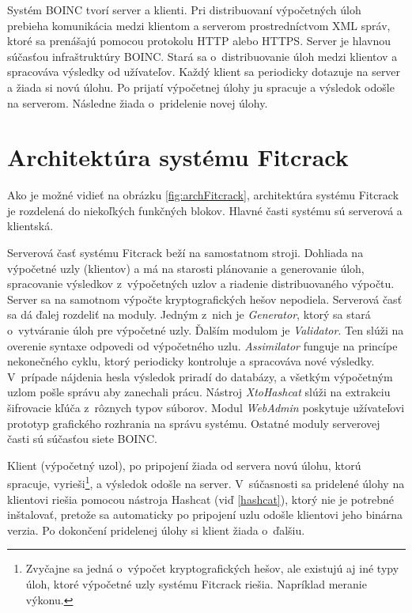 \documentclass[slovak,cprint]{fitthesis} %
\begin{document}
Systém BOINC tvorí server a klienti. Pri distribuovaní výpočetných úloh prebieha komunikácia medzi klientom a serverom prostredníctvom XML správ, ktoré sa prenášajú pomocou protokolu HTTP alebo HTTPS.
Server je hlavnou súčasťou infraštruktúry BOINC. Stará sa o~distribuovanie úloh medzi klientov a spracováva výsledky od užívateľov.
Každý klient sa periodicky dotazuje na server a žiada si novú úlohu. Po prijatí výpočetnej úlohy ju spracuje a výsledok odošle na serverom. Následne žiada o~pridelenie novej úlohy.\cite{boinccitace}


\section{Architektúra systému Fitcrack}
Ako je možné vidieť na obrázku \ref{fig:archFitcrack}, architektúra systému Fitcrack je rozdelená do niekoľkých funkčných blokov. Hlavné časti systému sú serverová a klientská.

Serverová časť systému Fitcrack beží na samostatnom stroji. Dohliada na výpočetné uzly (klientov) a má na starosti plánovanie a generovanie úloh, spracovanie výsledkov z~výpočetných uzlov a riadenie distribuovaného výpočtu. Server sa na samotnom výpočte kryptografických hešov nepodiela. Serverová časť sa dá ďalej rozdeliť na moduly. Jedným z~nich je \textit{Generator}, ktorý sa stará o~vytváranie úloh pre výpočetné uzly. Ďalším modulom je \textit{Validator}. Ten slúži na overenie syntaxe odpovedi od výpočetného uzlu. \textit{Assimilator} funguje na princípe nekonečného cyklu, ktorý periodicky kontroluje a spracováva nové výsledky. V~prípade nájdenia hesla výsledok priradí do databázy, a všetkým výpočetným uzlom pošle správu aby zanechali prácu. Nástroj \textit{XtoHashcat} slúži na extrakciu šifrovacie kľúča z~rôznych typov súborov. Modul \textit{WebAdmin} poskytuje užívateľovi prototyp grafického rozhrania na správu systému. Ostatné moduly serverovej časti sú súčasťou siete BOINC.

Klient (výpočetný uzol), po pripojení žiada od servera novú úlohu, ktorú spracuje, vyrieši\footnote{Zvyčajne sa jedná o~výpočet kryptografických hešov, ale existujú aj iné typy úloh, ktoré výpočetné uzly systému Fitcrack riešia. Napríklad meranie výkonu.}, a výsledok odošle na server. V~súčasnosti sa pridelené úlohy na klientovi riešia pomocou nástroja Hashcat (viď \ref{hashcat}), ktorý nie je potrebné inštalovať, pretože sa automaticky po pripojení uzlu odošle klientovi jeho binárna verzia. Po dokončení pridelenej úlohy si klient žiada o~ďalšiu.
\end{document}
